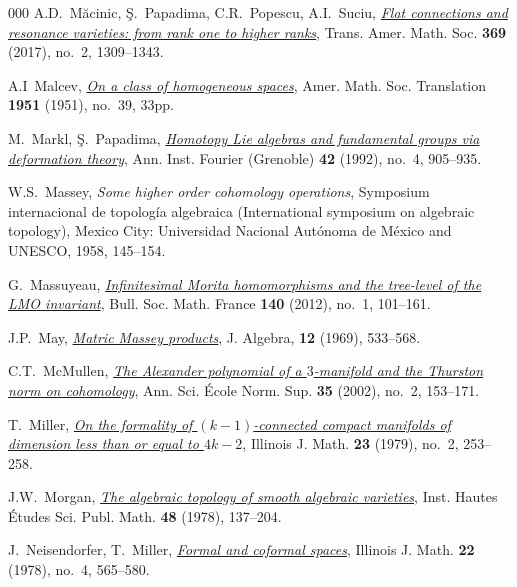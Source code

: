 \documentclass{article}
\numberwithin{equation}{section}
\theoremstyle{definition}
\begin{document}
\begin{thebibliography}{000}
  A.D.~M\u{a}cinic, \c{S}.~Papadima, C.R.~Popescu,  A.I.~Suciu, 
\href{https://dx.doi.org/10.1090/tran/6799}%
{\em Flat connections and resonance varieties: 
from rank one to higher ranks},  Trans. Amer. Math. Soc. 
\textbf{369} (2017), no.~2, 1309--1343.    

 A.I~Malcev, 
\href{http://mi.mathnet.ru/eng/izv3161}%
{\em On a class of homogeneous spaces}, Amer. Math. Soc.
Translation \textbf{1951} (1951), no.~39, 33pp. 

 M.~Markl, \c{S}.~Papadima,
\href{https://doi.org/10.5802/aif.1315}%
{\em Homotopy {L}ie algebras and fundamental groups via deformation theory}, 
Ann. Inst. Fourier (Grenoble) \textbf{42} (1992), no.~4, 905--935.

 W.S.~Massey, 
{\em Some higher order cohomology operations}, 
Symposium internacional de topología algebraica (International symposium on 
algebraic topology), Mexico City: Universidad Nacional Aut\'onoma de M\'exico 
and UNESCO, 1958, 145--154.

 G.~Massuyeau,
\href{https://doi.org/10.24033/bsmf.2625}%
{\emph{Infinitesimal {M}orita homomorphisms and the tree-level of the {LMO}
invariant}}, Bull. Soc. Math. France \textbf{140} (2012), no.~1, 101--161.

 J.P.~May,
\href{https://doi.org/10.1016/0021-8693(69)90027-1}%
{\em Matric Massey products},
J. Algebra, \textbf{12} (1969), 533--568.

 C.T.~McMullen,
\href{https://dx.doi.org/10.1016/S0012-9593(02)01086-8}%
{\em The Alexander polynomial of a $3$-manifold and the 
Thurston norm on cohomology}, Ann. Sci. \'{E}cole Norm. Sup. 
\textbf{35} (2002), no.~2, 153--171. 

 T.~Miller, 
\href{https://dx.doi.org/10.1215/ijm/1256048237}%
{\em On the formality of $(k-1)$-connected compact 
manifolds of dimension less than or equal to $4k-2$}, 
Illinois J. Math. \textbf{23} (1979), no.~2, 253--258. 

  J.W.~Morgan,
\href{https://dx.doi.org/10.1007/BF02684316}%
{\em The algebraic topology of smooth algebraic varieties},
Inst. Hautes \'{E}tudes Sci. Publ. Math. \textbf{48} (1978), 137--204.

 J.~Neisendorfer, T.~Miller,
\href{http://projecteuclid.org/euclid.ijm/1256048467}%
{\emph{Formal and coformal spaces}}, Illinois J. Math. 
\textbf{22} (1978), no.~4, 565--580.


\end{thebibliography}
\end{document}
